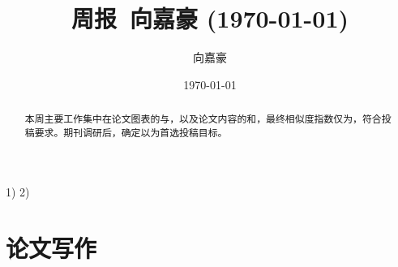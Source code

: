 \documentclass{article}
\title{周报~向嘉豪 (\today)}
\author{向嘉豪}
\date{\today}
\begin{document}
\maketitle

\begin{abstract}
  本周主要工作集中在论文图表的与，以及论文内容的和，最终相似度指数仅为，符合投稿要求。期刊调研后，确定以为首选投稿目标。
\end{abstract}

\begin{weekplan}
1) 
2) 
\end{weekplan}

\section{论文写作}


\end{document}

